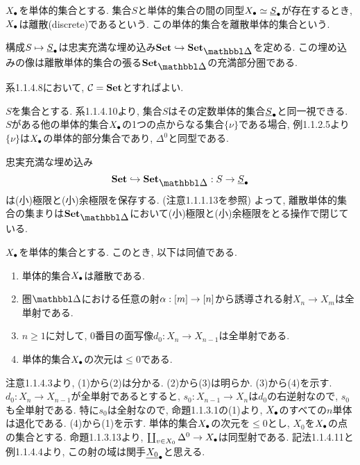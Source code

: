\documentclass[uplatex, a4paper, 14Q, dvipdfmx]{jsreport}
\begin{document}
\begin{definition}
  $X_\bullet$を単体的集合とする. 
  集合$S$と単体的集合の間の同型$\X \simeq \uline{S}_\bullet$が存在するとき, $X_\bullet$は離散(discrete)であるという. 
  この単体的集合を離散単体的集合という. 
\end{definition}

\begin{cor}
  構成$S \mt \uline{S}_\bullet$は忠実充満な埋め込み$\cset \hookrightarrow \sset$を定める. 
  この埋め込みの像は離散単体的集合の張る$\sset$の充満部分圏である. %
\end{cor}

\begin{Proof}
  系1.1.4.8において, $\mathcal{C}=\mathbf{Set}$とすればよい. 
\end{Proof}

\begin{nota}
  $S$を集合とする. 
  系1.1.4.10より, 集合$S$はその定数単体的集合$\uline{S}_\bullet$と同一視できる. 
  $S$がある他の単体的集合$X_\bullet$の1つの点からなる集合$\{\nu\}$である場合, 例1.1.2.5より$\{\nu\}$は$X_\bullet$の単体的部分集合であり, $\Delta^0$と同型である. 
\end{nota}

\begin{remark}
  忠実充満な埋め込み
  \begin{align*}
    \cset \hookrightarrow \sset : S \to \uline{S}_\bullet
  \end{align*}
  は(小)極限と(小)余極限を保存する. (注意1.1.1.13を参照)
  よって, 離散単体的集合の集まりは$\sset$において(小)極限と(小)余極限をとる操作で閉じている. 
\end{remark}

\begin{prop}
  $X_\bullet$を単体的集合とする. 
  このとき, 以下は同値である. 
  \begin{enumerate}
    \item 単体的集合$X_\bullet$は離散である.
    \item 圏$\csim$における任意の射$\alpha: [m] \to [n]$から誘導される射$X_n \to X_m$は全単射である. 
    \item $n \geq 1$に対して, $0$番目の面写像$d_0: X_n \to X_{n-1}$は全単射である. 
    \item 単体的集合$X_\bullet$の次元は$\leq 0$である. 
  \end{enumerate}
\end{prop}

\begin{Proof}
  注意1.1.4.3より, (1)から(2)は分かる. 
  (2)から(3)は明らか. 
  (3)から(4)を示す. 
  $d_0: X_n \to X_{n-1}$が全単射であるとすると, $s_0: X_{n-1} \to X_n$は$d_0$の右逆射なので, $s_0$も全単射である. 
  特に$s_0$は全射なので, 命題1.1.3.1の(1)より, $X_\bullet$のすべての$n$単体は退化である. 
  (4)から(1)を示す. 
  単体的集合$X_\bullet$の次元を$\leq 0$とし, $X_0$を$X_\bullet$の点の集合とする. 
  命題1.1.3.13より, $\coprod_{v \in X_0} \Delta^0 \to X_\bullet$は同型射である.
  記法1.1.4.11と例1.1.4.4より, この射の域は関手$\uline{X_0}_{\bullet}$と思える. 
\end{Proof}
\end{document}
